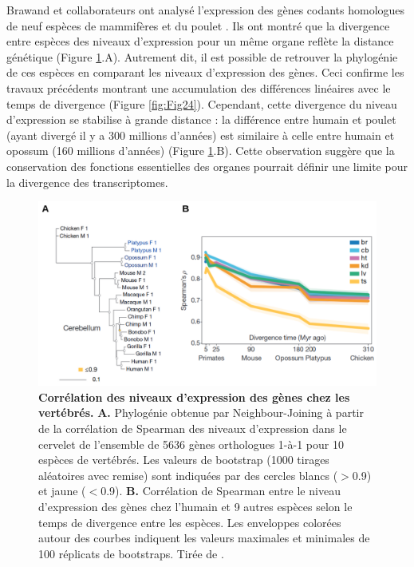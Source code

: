 Brawand et collaborateurs ont analysé l’expression des gènes codants homologues de neuf espèces de mammifères et du poulet \citep{brawand_evolution_2011}. Ils ont montré que la divergence entre espèces des niveaux d’expression pour un même organe reflète la distance génétique (Figure \ref{fig:Fig26}.A). Autrement dit, il est possible de retrouver la phylogénie de ces espèces en comparant les niveaux d’expression des gènes. Ceci confirme les travaux précédents montrant une accumulation des différences linéaires avec le temps de divergence (Figure \ref{fig:Fig24}). Cependant, cette divergence du niveau d’expression se stabilise à grande distance : la différence entre humain et poulet (ayant divergé il y a 300 millions d’années) est similaire à celle entre humain et opossum (160 millions d’années) (Figure \ref{fig:Fig26}.B). Cette observation suggère que la conservation des fonctions essentielles des organes pourrait définir une limite pour la divergence des \glspl{transcriptome}.

\begin{figure}[h]
 \centering
 \includegraphics[width=1\textwidth, page=1] {figures/introduction/fig26.png}
 \caption[Corrélation des niveaux d'expression des gènes chez les vertébrés.]{
 \textbf{Corrélation des niveaux d'expression des gènes chez les vertébrés.}
 \textbf{A.} Phylogénie obtenue par Neighbour-Joining à partir de la corrélation de Spearman des niveaux d'expression dans le cervelet de l'ensemble de 5636 gènes orthologues 1-à-1 pour 10 espèces de vertébrés. Les valeurs de bootstrap (1000 tirages aléatoires avec remise) sont indiquées par des cercles blancs ($>$0.9) et jaune ($<$0.9).
 \textbf{B.} Corrélation de Spearman entre le niveau d'expression des gènes chez l'humain et 9 autres espèces selon le temps de divergence entre les espèces. Les enveloppes colorées autour des courbes indiquent les valeurs maximales et minimales de 100 réplicats de bootstraps. Tirée de \citet{brawand_evolution_2011}. \\
 }
 \label{fig:Fig26}
\end{figure} 

